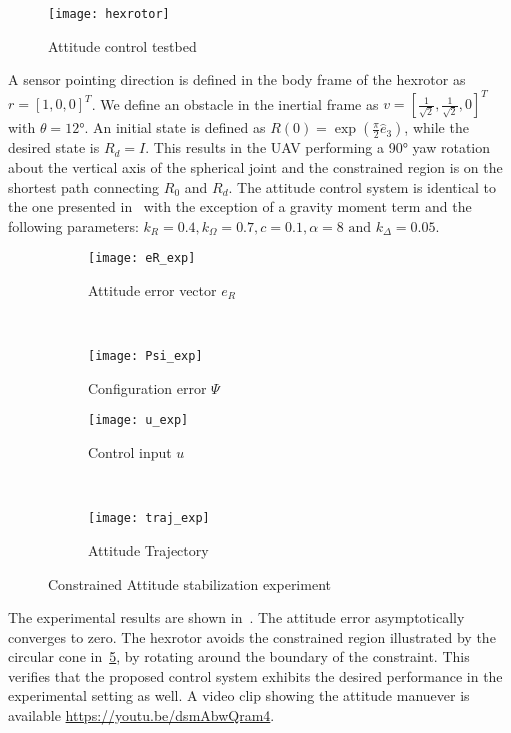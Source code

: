 \documentclass[letterpaper, 10 pt, conference]{ieeeconf}  %
\begin{document}
\begin{figure}
	\centering
	\texttt{[image: hexrotor]}
	\caption{Attitude control testbed~\label{fig:hexrotor}}
\end{figure}
A sensor pointing direction is defined in the body frame of the hexrotor as \( r = [1,0,0]^T \).
We define an obstacle in the inertial frame as \( v = [\frac{1}{\sqrt{2}}, \frac{1}{\sqrt{2}}, 0]^T \) with \( \theta = \ang{12} \).
An initial state is defined as \(R(0) = \exp( \frac{\pi}{2} \hat{e}_3) \), while the desired state is \(R_d =I \).
This results in the UAV performing a \ang{90} yaw rotation about the vertical axis of the spherical joint and the constrained region is on the shortest path connecting $R_0$ and $R_d$. 
The attitude control system is identical to the one presented in~ with the exception of a gravity moment term and the following parameters: \(k_R = 0.4, k_\Omega = 0.7 ,c = 0.1 , \alpha = 8 \text{ and } k_\Delta = 0.05\).
\begin{figure} 
	\centering 
	\begin{subfigure}[htbp]{0.5\columnwidth} 
		\texttt{[image: eR\_exp]} 
		\caption{Attitude error vector \(e_R\) } \label{fig:eR_exp} 
	\end{subfigure}~ %
	\begin{subfigure}[htbp]{0.5\columnwidth} 
		\texttt{[image: Psi\_exp]} 
		\caption{Configuration error \( \Psi \)} \label{fig:Psi_exp} 
	\end{subfigure}
	
	\begin{subfigure}[htbp]{0.5\columnwidth} 
		\texttt{[image: u\_exp]} 
		\caption{Control input \( u\)} \label{fig:u_exp} 
	\end{subfigure}~
	\begin{subfigure}[htbp]{0.5\columnwidth} 
		\texttt{[image: traj\_exp]} 
		\caption{Attitude Trajectory} \label{fig:traj_exp} 
	\end{subfigure}
	\caption{Constrained Attitude stabilization experiment}
	\label{fig:exp} 
\end{figure}


The experimental results are shown in~.
The attitude error asymptotically converges to zero. 
The hexrotor avoids the constrained region illustrated by the circular cone in~\cref{fig:traj_exp}, by rotating around the boundary of the constraint. 
This verifies that the proposed control system exhibits the desired performance in the experimental setting as well. 
A video clip showing the attitude manuever is available \url{https://youtu.be/dsmAbwQram4}.
\end{document}
